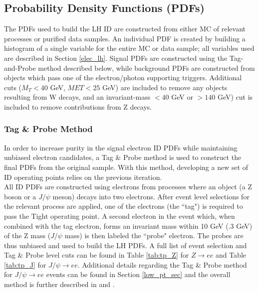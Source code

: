 \subsection{Probability Density Functions (PDFs)}\label{sec:pdfs}
The PDFs used to build the LH ID are constructed from either MC of relevant processes or purified data samples. An individual PDF is created by building a histogram of a single variable for the entire MC or data sample; all variables used are described in Section \ref{elec_lh}. Signal PDFs are constructed using the Tag-and-Probe method described below, while background PDFs are constructed from objects which pass one of the electron/photon supporting triggers. Additional cuts ($M_T<40$ GeV, $MET<25$ GeV) are included to remove any objects resulting from W decays, and an invariant-mass $<40$ GeV or $>140$ GeV) cut is included to remove contributions from Z decays.\\

\subsubsection{Tag \& Probe Method}
In order to increase purity in the signal electron ID PDFs while maintaining unbiased electron candidates, a Tag \& Probe method is used to construct the final PDFs from the original sample. With this method, developing a new set of ID operating points relies on the previous iteration. \\

All ID PDFs are constructed using electrons from processes where an object (a Z boson or a $J/\psi$ meson) decays into two electrons. After event level selections for the relevant process are applied, one of the electrons (the ``tag") is required to pass the Tight operating point. A second electron in the event which, when combined with the tag electron, forms an invariant mass within 10 GeV (.3 GeV) of the Z mass ($J/\psi$ mass) is then labeled the ``probe" electron. The probes are thus unbiased and used to build the LH PDFs. A full list of event selection and Tag \& Probe level cuts can be found in Table \ref{tab:tp_Z} for $Z\rightarrow ee$ and Table \ref{tab:tp_J} for $J/\psi \rightarrow ee$. Additional details regarding the Tag \& Probe method for $J/\psi\rightarrow ee$ events can be found in Section \ref{low_pt_sec} and the overall method is further described in \cite{run1_elec_paper} and \cite{id_note}.

